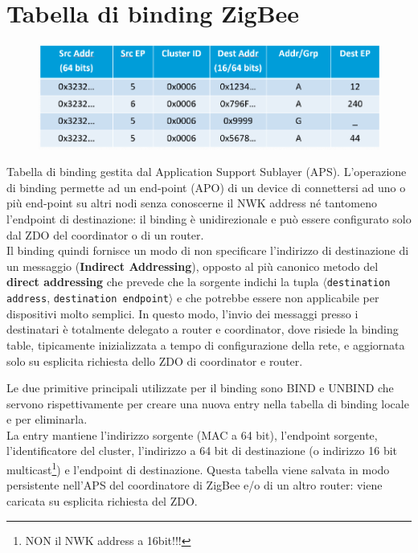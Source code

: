 \section{Tabella di binding ZigBee}

\begin{figure}[htbp]
   \centering
   \includegraphics{images/questions/Schermata del 2023-10-19 15-37-17.png}
   \label{fig:dom10}
\end{figure}

Tabella di binding gestita dal Application Support Sublayer (APS). L'operazione di binding permette ad un end-point (APO) di un device di connettersi ad uno o più end-point su altri nodi senza conoscerne il NWK address né tantomeno l'endpoint di destinazione: il binding è unidirezionale e può essere configurato solo dal ZDO del coordinator o di un router. \\
Il binding quindi fornisce un modo di non specificare l'indirizzo di destinazione di un messaggio (\textbf{Indirect Addressing}), opposto al più canonico metodo del \textbf{direct addressing} che prevede che la sorgente indichi la tupla $\langle$\texttt{destination address}, \texttt{destination endpoint}$\rangle$ e che potrebbe essere non applicabile per dispositivi molto semplici.
In questo modo, l'invio dei messaggi presso i destinatari è totalmente delegato a router e coordinator, dove risiede la binding table, tipicamente inizializzata a tempo di configurazione della rete, e aggiornata solo su esplicita richiesta dello ZDO di coordinator e router.



Le due primitive principali utilizzate per il binding sono BIND e UNBIND che servono rispettivamente per creare una nuova entry nella tabella di binding locale e per eliminarla. \\
La entry mantiene l'indirizzo sorgente (MAC a 64 bit), l'endpoint sorgente, l'identificatore del cluster, l'indirizzo a 64 bit di destinazione (o indirizzo 16 bit multicast\footnote{NON il NWK address a 16bit!!!}) e l'endpoint di destinazione. Questa tabella viene salvata in modo persistente nell'APS del coordinatore di ZigBee e/o di un altro router: viene caricata su esplicita richiesta del ZDO.

